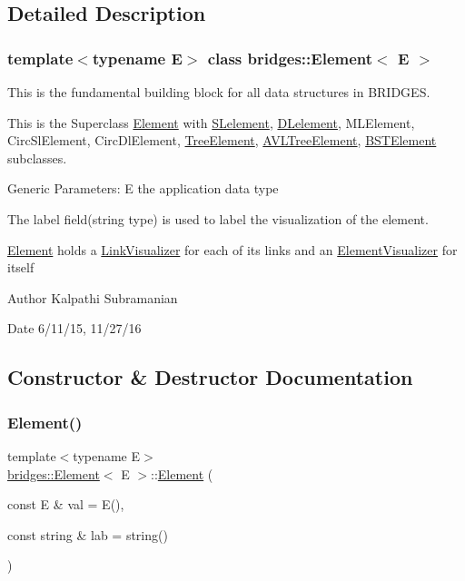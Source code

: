 \subsection{Detailed Description}
\subsubsection*{template$<$typename E$>$\newline
class bridges\+::\+Element$<$ E $>$}

This is the fundamental building block for all data structures in B\+R\+I\+D\+G\+ES. 

This is the Superclass \mbox{\hyperlink{classbridges_1_1_element}{Element}} with \mbox{\hyperlink{classbridges_1_1_s_lelement}{S\+Lelement}}, \mbox{\hyperlink{classbridges_1_1_d_lelement}{D\+Lelement}}, M\+L\+Element, Circ\+Sl\+Element, Circ\+Dl\+Element, \mbox{\hyperlink{classbridges_1_1_tree_element}{Tree\+Element}}, \mbox{\hyperlink{classbridges_1_1_a_v_l_tree_element}{A\+V\+L\+Tree\+Element}}, \mbox{\hyperlink{classbridges_1_1_b_s_t_element}{B\+S\+T\+Element}} subclasses.

Generic Parameters\+: E the application data type

The label field(string type) is used to label the visualization of the element.

\mbox{\hyperlink{classbridges_1_1_element}{Element}} holds a \mbox{\hyperlink{classbridges_1_1_link_visualizer}{Link\+Visualizer}} for each of its links and an \mbox{\hyperlink{classbridges_1_1_element_visualizer}{Element\+Visualizer}} for itself

\begin{DoxyAuthor}{Author}
Kalpathi Subramanian
\end{DoxyAuthor}
\begin{DoxyDate}{Date}
6/11/15, 11/27/16 
\end{DoxyDate}


\subsection{Constructor \& Destructor Documentation}
\mbox{\label{classbridges_1_1_element_abc7131584142ea48faf3b7a8033d1fef}} 
\subsubsection{\texorpdfstring{Element()}{Element()}}
{\footnotesize\ttfamily template$<$typename E$>$ \\
\mbox{\hyperlink{classbridges_1_1_element}{bridges\+::\+Element}}$<$ E $>$\+::\mbox{\hyperlink{classbridges_1_1_element}{Element}} (\begin{DoxyParamCaption}\item[{const E \&}]{val = {\ttfamily E()},  }\item[{const string \&}]{lab = {\ttfamily string()} }\end{DoxyParamCaption})\hspace{0.3cm}{\ttfamily [inline]}}

